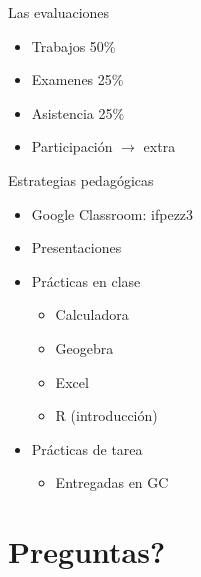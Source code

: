 \documentclass[
  11pt,
  ignorenonframetext,
]{beamer}
\providecommand{\tightlist}{%
  \setlength{\itemsep}{0pt}\setlength{\parskip}{0pt}}
\begin{document}
\begin{frame}{Las evaluaciones}
\protect\hypertarget{las-evaluaciones}{}
\begin{itemize}
\tightlist
\item
  Trabajos 50\%
\item
  Examenes 25\%
\item
  Asistencia 25\%
\item
  Participación \(\rightarrow\) extra
\end{itemize}
\end{frame}

\begin{frame}{Estrategias pedagógicas}
\protect\hypertarget{estrategias-pedaguxf3gicas}{}
\begin{itemize}
\item
  Google Classroom: ifpezz3
\item
  Presentaciones
\item
  Prácticas en clase

  \begin{itemize}
  \tightlist
  \item
    Calculadora
  \item
    Geogebra
  \item
    Excel
  \item
    R (introducción)
  \end{itemize}
\item
  Prácticas de tarea

  \begin{itemize}
  \tightlist
  \item
    Entregadas en GC
  \end{itemize}
\end{itemize}
\end{frame}

\hypertarget{preguntas}{%
\section{Preguntas?}\label{preguntas}}
\end{document}
